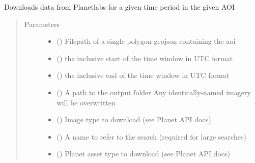 \documentclass[letterpaper,10pt,english]{sphinxmanual}
\begin{document}
\begin{fulllineitems}
\label{\detokenize{index:pyeo.queries_and_downloads.planet_query}}
Downloads data from Planetlabs for a given time period in the given AOI
\begin{quote}\begin{description}
\item[{Parameters}] \leavevmode\begin{itemize}
\item {} 
 () \textendash{} Filepath of a single-polygon geojson containing the aoi

\item {} 
 () \textendash{} the inclusive start of the time window in UTC format

\item {} 
 () \textendash{} the inclusive end of the time window in UTC format

\item {} 
 () \textendash{} A path to the output folder
Any identically-named imagery will be overwritten

\item {} 
 () \textendash{} Image type to download (see Planet API docs)

\item {} 
 () \textendash{} A name to refer to the search (required for large searches)

\item {} 
 () \textendash{} Planet asset type to download (see Planet API docs)


\end{itemize}
\end{description}
\end{quote}
\end{fulllineitems}
\end{document}
